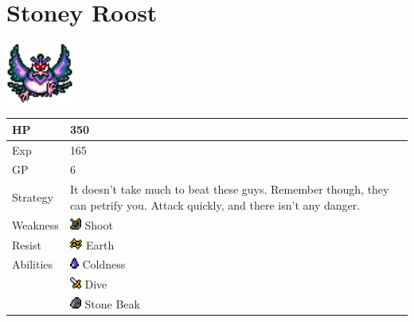 \section{Stoney Roost}
\label{monster:stoney_roost}

\includegraphics[height=2cm,keepaspectratio]{./resources/monster/stoney_roost}

\begin{longtable}{ l p{9cm} }
	HP
	& 350
\\ \hline
	Exp
	& 165
\\ \hline
	GP
	& 6
\\ \hline
	Strategy
	& It doesn't take much to beat these guys. Remember though, they can petrify you. Attack quickly, and there isn't any danger.
\\ \hline
	Weakness
	& \includegraphics[height=1em,keepaspectratio]{./resources/effects/shoot} Shoot
\\ \hline
	Resist
	& \includegraphics[height=1em,keepaspectratio]{./resources/effects/earth} Earth
\\ \hline
	Abilities
	& \includegraphics[height=1em,keepaspectratio]{./resources/effects/water} Coldness \\
	& \includegraphics[height=1em,keepaspectratio]{./resources/effects/damage} Dive \\
	& \includegraphics[height=1em,keepaspectratio]{./resources/effects/petrify} Stone Beak
\end{longtable}

